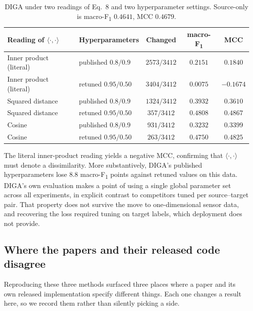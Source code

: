 \documentclass[a4paper,fleqn]{cas-dc}
\newcommand{\macf}{macro-F\textsubscript{1}}
\begin{document}
\begin{table}[t]
\centering
\caption{DIGA under two readings of Eq.~8 and two hyperparameter settings. Source-only is
\macf{} $0.4641$, MCC $0.4679$.}
\label{tab:diga}
\small
\begin{tabular}{llccc}
\toprule
Reading of $\langle\cdot,\cdot\rangle$ & Hyperparameters & Changed & \macf & MCC \\
\midrule
Inner product (literal) & published $0.8/0.9$   & $2573/3412$ & $0.2151$ & $0.1840$ \\
Inner product (literal) & retuned $0.95/0.50$   & $3404/3412$ & $0.0075$ & $-0.1674$ \\
Squared distance        & published $0.8/0.9$   & $1324/3412$ & $0.3932$ & $0.3610$ \\
Squared distance        & retuned $0.95/0.50$   & $357/3412$  & $\mathbf{0.4808}$ & $\mathbf{0.4867}$ \\
Cosine                  & published $0.8/0.9$   & $931/3412$  & $0.3232$ & $0.3399$ \\
Cosine                  & retuned $0.95/0.50$   & $263/3412$  & $0.4750$ & $0.4825$ \\
\bottomrule
\end{tabular}
\end{table}

The literal inner-product reading yields a negative MCC, confirming that
$\langle\cdot,\cdot\rangle$ must denote a dissimilarity. More substantively, DIGA's
published hyperparameters lose $8.8$ \macf{} points against retuned values on this data.
DIGA's own evaluation makes a point of using a single global parameter set across all
experiments, in explicit contrast to competitors tuned per source--target pair. That
property does not survive the move to one-dimensional sensor data, and recovering the loss
required tuning on target labels, which deployment does not provide.

\subsection{Where the papers and their released code disagree}
\label{sec:res-impl}

Reproducing these three methods surfaced three places where a paper and its own released
implementation specify different things. Each one changes a result here, so we record them
rather than silently picking a side.
\end{document}
